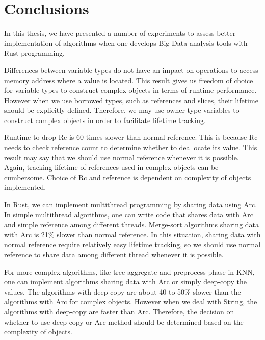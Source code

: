 \chapter{Conclusions}
\label{chapter:Conclusions}
\thispagestyle{myheadings}

\graphicspath{{3_Conclusion/Figures/}}

In this thesis, we have presented a number of experiments to assess better implementation of algorithms 
when one develops Big Data analysis tools with Rust programming. 

Differences between variable types do not have an impact on operations to access memory address where a value is located. 
This result gives us freedom of choice for variable types to construct complex objects in terms of runtime performance. 
However when we use borrowed types, such as references and slices, their lifetime should be explicitly defined. 
Therefore, we may use owner type variables to construct complex objects in order to facilitate lifetime tracking.

Runtime to drop Rc is 60 times slower than normal reference. This is because Rc needs to check reference count to determine whether to deallocate its value. 
This result may say that we should use normal reference whenever it is possible. 
Again, tracking lifetime of references used in complex objects can be cumbersome. 
Choice of Rc and reference is dependent on complexity of objects implemented.

In Rust, we can implement multithread programming by sharing data using Arc. In simple multithread algorithms, 
one can write code that shares data with Arc and simple reference among different threads.
Merge-sort algorithms sharing data with Arc is 21\% slower than normal reference. 
In this situation, sharing data with normal reference require relatively easy lifetime tracking, 
so we should use normal reference to share data among different thread whenever it is possible.

For more complex algorithms, like tree-aggregate and preprocess phase in KNN, one can implement algorithms sharing data with Arc or simply deep-copy the values.
The algorithms with deep-copy are about 40 to 50\% slower than the algorithms with Arc for complex objects.
However when we deal with String, the algorithms with deep-copy are faster than Arc. 
Therefore, the decision on whether to use deep-copy or Arc method should be determined based on the complexity of objects.

